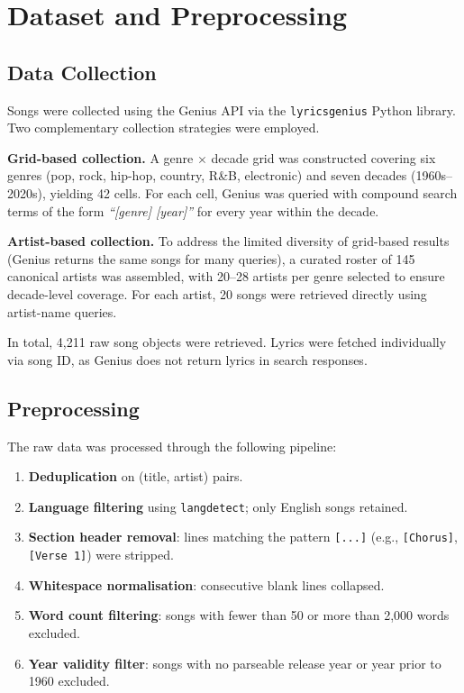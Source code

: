 \documentclass[pdflatex,sn-mathphys-num]{sn-jnl}
\begin{document}
\section{Dataset and Preprocessing}\label{sec3}

\subsection{Data Collection}\label{subsec1}

Songs were collected using the Genius API via the \texttt{lyricsgenius} Python library. Two complementary collection strategies were employed.

\textbf{Grid-based collection.} A genre $\times$ decade grid was constructed covering six genres (pop, rock, hip-hop, country, R\&B, electronic) and seven decades (1960s--2020s), yielding 42 cells. For each cell, Genius was queried with compound search terms of the form \textit{``[genre] [year]''} for every year within the decade.

\textbf{Artist-based collection.} To address the limited diversity of grid-based results (Genius returns the same songs for many queries), a curated roster of 145 canonical artists was assembled, with 20--28 artists per genre selected to ensure decade-level coverage. For each artist, 20 songs were retrieved directly using artist-name queries.

In total, 4,211 raw song objects were retrieved. Lyrics were fetched individually via song ID, as Genius does not return lyrics in search responses.

\subsection{Preprocessing}\label{subsec2}

The raw data was processed through the following pipeline:

\begin{enumerate}[noitemsep]
    \item \textbf{Deduplication} on (title, artist) pairs.
    \item \textbf{Language filtering} using \texttt{langdetect}; only English songs retained.
    \item \textbf{Section header removal}: lines matching the pattern \texttt{[...]} (e.g., \texttt{[Chorus]}, \texttt{[Verse~1]}) were stripped.
    \item \textbf{Whitespace normalisation}: consecutive blank lines collapsed.
    \item \textbf{Word count filtering}: songs with fewer than 50 or more than 2,000 words excluded.
    \item \textbf{Year validity filter}: songs with no parseable release year or year prior to 1960 excluded.
\end{enumerate}
\end{document}
